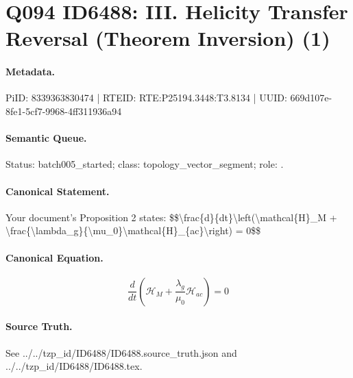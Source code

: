\section*{Q094 ID6488: III. Helicity Transfer Reversal (Theorem Inversion) (1)}
\paragraph{Metadata.}
PiID: 8339363830474 | RTEID: RTE:P25194.3448:T3.8134 | UUID: 669d107e-8fe1-5cf7-9968-4ff311936a94

\paragraph{Semantic Queue.}
Status: batch005\_started; class: topology\_vector\_segment; role: .

\paragraph{Canonical Statement.}
Your document's Proposition 2 states: \$\$\textbackslash{}frac\{d\}\{dt\}\textbackslash{}left(\textbackslash{}mathcal\{H\}\_M + \textbackslash{}frac\{\textbackslash{}lambda\_g\}\{\textbackslash{}mu\_0\}\textbackslash{}mathcal\{H\}\_\{ac\}\textbackslash{}right) = 0\$\$

\paragraph{Canonical Equation.}
\[
\frac{d}{dt}\left(\mathcal{H}_M + \frac{\lambda_g}{\mu_0}\mathcal{H}_{ac}\right) = 0
\]

\paragraph{Source Truth.}
See ../../tzp\_id/ID6488/ID6488.source\_truth.json and ../../tzp\_id/ID6488/ID6488.tex.
